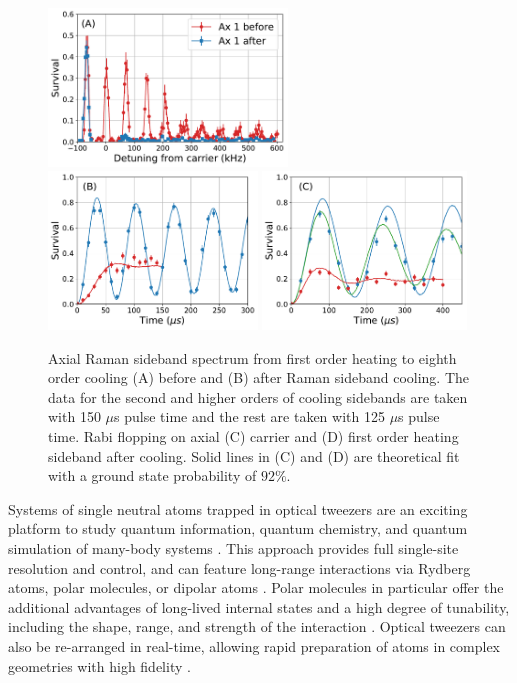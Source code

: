 \documentclass[aps,prl,twocolumn,groupedaddress]{revtex4-1}
\begin{document}
\begin{figure}
  \includegraphics[height=4.2cm]{imgs/spectrum_a1.pdf}
  \includegraphics[height=4.2cm]{imgs/rabi_flop_a1_0.pdf}
  \includegraphics[height=4.2cm]{imgs/rabi_flop_a1_p1.pdf}
  \caption{Axial Raman sideband spectrum from first order heating to eighth order cooling
    (A) before and (B) after Raman sideband cooling.
    The data for the second and higher orders of cooling sidebands are taken with 150 $\mu$s
    pulse time and the rest are taken with 125 $\mu$s pulse time.
    Rabi flopping on axial (C) carrier and (D) first order heating sideband
    after cooling.
    Solid lines in (C) and (D) are theoretical fit with a ground state probability of $92\%$.
    \label{f-axial}}
\end{figure}

Systems of single neutral atoms trapped in optical tweezers are an exciting platform to study quantum information, quantum chemistry,
and quantum simulation of many-body systems .
This approach provides full single-site resolution and control, and can feature long-range interactions via Rydberg atoms, polar molecules, or dipolar atoms .
Polar molecules in particular offer the additional advantages of long-lived internal states
and a high degree of tunability, including the shape, range,
and strength of the interaction .
Optical tweezers can also be re-arranged in real-time, allowing rapid preparation of atoms in complex geometries with high fidelity .
\end{document}
